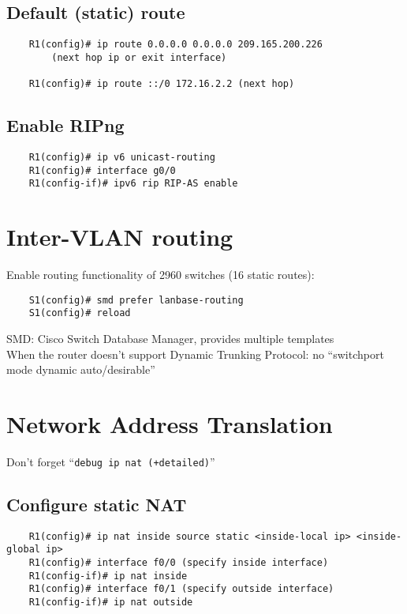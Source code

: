 \documentclass[10pt, a4paper]{article}
\begin{document}
	\subsection{Default (static) route}
	\begin{lstlisting}
	R1(config)# ip route 0.0.0.0 0.0.0.0 209.165.200.226
		(next hop ip or exit interface)

	R1(config)# ip route ::/0 172.16.2.2 (next hop)
	\end{lstlisting}

	\subsection{Enable RIPng}
	\begin{lstlisting}
	R1(config)# ip v6 unicast-routing
	R1(config)# interface g0/0
	R1(config-if)# ipv6 rip RIP-AS enable
	\end{lstlisting}

	\section{Inter-VLAN routing}
	Enable routing functionality of 2960 switches (16 static routes):\\
	\begin{lstlisting}
	S1(config)# smd prefer lanbase-routing
	S1(config)# reload
	\end{lstlisting}
	SMD: Cisco Switch Database Manager, provides multiple templates\\
	When the router doesn't support Dynamic Trunking Protocol: no ``switchport mode dynamic auto/desirable''

	\section{Network Address Translation}
	Don't forget ``\texttt{debug ip nat (+detailed)}''
	\subsection{Configure static NAT}
	\begin{lstlisting}
	R1(config)# ip nat inside source static <inside-local ip> <inside-global ip>
	R1(config)# interface f0/0 (specify inside interface)
	R1(config-if)# ip nat inside
	R1(config)# interface f0/1 (specify outside interface)
	R1(config-if)# ip nat outside
	\end{lstlisting}
\end{document}
